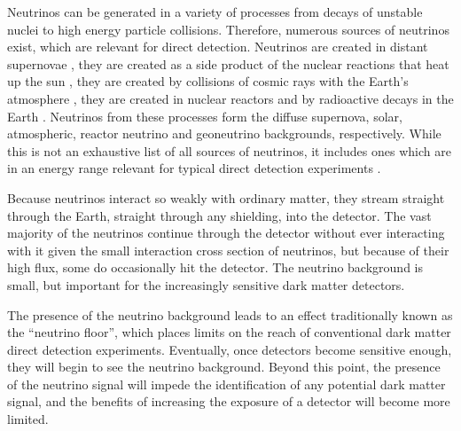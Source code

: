 Neutrinos can be generated in a variety of processes from decays of unstable nuclei to high energy particle collisions. Therefore, numerous sources of neutrinos exist, which are relevant for direct detection. Neutrinos are created in distant supernovae \parencite{Beacom2010}, they are created as a side product of the nuclear reactions that heat up the sun \parencites{BergstromEtAl2016, OrebiGann2021}, they are created by collisions of cosmic rays with the Earth's atmosphere \parencite{BattistoniEtAl2005}, they are created in nuclear reactors \parencites{MuellerEtAl2011, MaEtAl2013} and by radioactive decays in the Earth \parencites{LudhovaZavatarelli2013, HuangEtAl2013}. Neutrinos from these processes form the diffuse supernova, solar, atmospheric, reactor neutrino and geoneutrino backgrounds, respectively. While this is not an exhaustive list of all sources of neutrinos, it includes ones which are in an energy range relevant for typical direct detection experiments \parencite{VitaglianoTamborraRaffelt2020}.

Because neutrinos interact so weakly with ordinary matter, they stream straight through the Earth, straight through any shielding, into the detector. The vast majority of the neutrinos continue through the detector without ever interacting with it given the small interaction cross section of neutrinos, but because of their high flux, some do occasionally hit the detector. The neutrino background is small, but important for the increasingly sensitive dark matter detectors.

The presence of the neutrino background leads to an effect traditionally known as the ``neutrino floor'', which places limits on the reach of conventional dark matter direct detection experiments. Eventually, once detectors become sensitive enough, they will begin to see the neutrino background. Beyond this point, the presence of the neutrino signal will impede the identification of any potential dark matter signal, and the benefits of increasing the exposure of a detector will become more limited.

